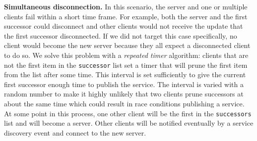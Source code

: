 \textbf{Simultaneous disconnection.} 
In this scenario, the server and one or multiple clients fail within a short time frame. 
For example, both the server and the first successor could disconnect and other clients would not receive the update that the first successor disconnected. 
If we did not target this case specifically, no client would become the new server because they all expect a disconnected client to do so. 
We solve this problem with a \textit{repeated timer} algorithm: clients that are not the first item in the \texttt{successor} list set a timer that will prune the first item from the list after some time. 
This interval is set sufficiently to give the current first successor enough time to publish the service. 
The interval is varied with a random number to make it highly unlikely that two clients prune successors at about the same time which could result in race conditions publishing a service. 
At some point in this process, one other client will be the first in the \texttt{successors} list and will become a server. 
Other clients will be notified eventually by a service discovery event and connect to the new server.